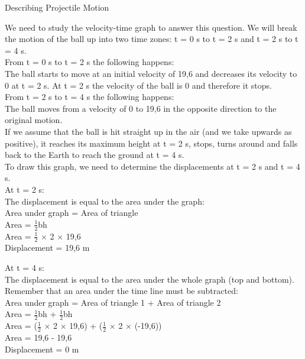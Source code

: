 \begin{wex}{Describing Projectile Motion}
{We need to study the velocity-time graph to answer this question. We will break the motion of the ball up into two time zones: t = 0 s to t = 2 s and t = 2 s to t = 4 s.\\
From t = 0 s to t = 2 s the following happens:\\
The ball starts to move at an initial velocity of 19,6 \ms and decreases its velocity to 0 \ms at t = 2 s. 
At t = 2 s the velocity of the ball is 0 \ms and therefore it stops.\\
From t = 2 s to t = 4 s the following happens:\\
The ball moves from a velocity of 0 \ms to 19,6 \ms in the opposite direction to the original motion.\\
If we assume that the ball is hit straight up in the air (and we take upwards as positive), it reaches its maximum height at t = 2 s, stops, turns around and falls back to the Earth to reach the ground at t = 4 s.  \\

To draw this graph, we need to determine the displacements at t = 2 s and t = 4 s.\\
At t = 2 s: \\
The displacement is equal to the area under the graph:\\
Area under graph = Area of triangle\\
Area = $\frac{1}{2}$bh\\
Area = $\frac{1}{2}$ $\times$ 2 $\times$ 19,6\\
Displacement = 19,6 m

At t = 4 s: \\
The displacement is equal to the area under the whole graph (top and bottom). Remember that an area under the time line must be subtracted:\\
Area under graph = Area of triangle 1 + Area of triangle 2\\
Area = $\frac{1}{2}$bh + $\frac{1}{2}$bh\\
Area = ($\frac{1}{2}$ $\times$ 2 $\times$ 19,6) + ($\frac{1}{2}$ $\times$ 2 $\times$ (-19,6))\\
Area = 19,6 - 19,6 \\
Displacement = 0 m

}
\end{wex}
